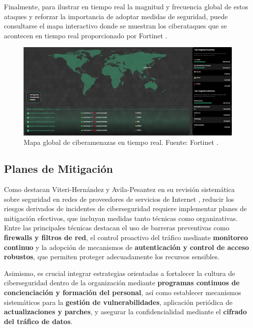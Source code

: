 \documentclass[a4paper, 11pt]{article}
\begin{document}
Finalmente, para ilustrar en tiempo real la magnitud y frecuencia global de estos ataques y reforzar la importancia de adoptar medidas de seguridad, puede consultarse el mapa 
interactivo donde se muestran los ciberataques que se acontecen en tiempo real proporcionado por Fortinet \cite{fortinet}. 

\begin{figure}[H]
    \centering
    \includegraphics[width=\textwidth]{images/mapa.png}
    \caption{Mapa global de ciberamenazas en tiempo real. Fuente: Fortinet \cite{fortinet}.}
    \label{fig:mapa-fortiguard}
\end{figure}
\par\vspace{0.5cm}

\subsection{Planes de Mitigación}
\par\vspace{0.5cm}

Como destacan Viteri-Hernández y Avila-Pesantez en su revisión sistemática sobre seguridad en redes de proveedores de servicios de Internet \cite{mitigacion}, reducir los riesgos derivados de incidentes de ciberseguridad requiere implementar planes de mitigación efectivos, que incluyan medidas tanto técnicas como organizativas. Entre las principales técnicas destacan el uso de barreras preventivas como \textbf{firewalls y filtros de red}, el control proactivo del tráfico mediante \textbf{monitoreo continuo} y la adopción de mecanismos de \textbf{autenticación y control de acceso robustos}, que permiten proteger adecuadamente los recursos sensibles.
\par\vspace{0.5cm}

Asimismo, es crucial integrar estrategias orientadas a fortalecer la cultura de ciberseguridad dentro de la organización mediante \textbf{programas continuos de concienciación y formación del personal}, así como establecer mecanismos sistemáticos para la \textbf{gestión de vulnerabilidades}, aplicación periódica de \textbf{actualizaciones y parches}, y asegurar la confidencialidad mediante el \textbf{cifrado del tráfico de datos}.
\par\vspace{0.5cm}
\end{document}

